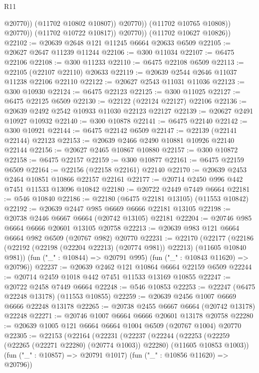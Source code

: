 \begin{lexlean}{R11}
\begin{coremodule}
{{{{{{{{{{{{{{{{{{{{{{{{{{{{{{{{{{{{{{{{{{{{{{{{{{{{{{{{{{{{{{{{{{{{{{{{{{{{{{{{{{                            @20770))
                        (@11702 @10802 @10807))
                      @20770))
                  (@11702 @10765 @10808))
                @20770))
            (@11702 @10722 @10817))
          @20770))
      (@11702 @10627 @10826))
@22102 := @20639 @2648 @121 @11245 @6664 @20633 @6509
@22105 := @20627 @2647 @11239 @11244
@22106 := @300 @11034
@22107 := @6475 @22106
@22108 := @300 @11233
@22110 := @6475 @22108 @6509
@22113 := @22105 (@22107 @22110) @20633
@22119 := @20639 @2544 @2646 @11037 @11238 @22106 @22110
@22122 := @20627 @2543 @11031 @11036
@22123 := @300 @10930
@22124 := @6475 @22123
@22125 := @300 @11025
@22127 := @6475 @22125 @6509
@22130 := @22122 (@22124 @22127) @22106
@22136 := @20639 @2492 @2542 @10933 @11030 @22123 @22127
@22139 := @20627 @2491 @10927 @10932
@22140 := @300 @10878
@22141 := @6475 @22140
@22142 := @300 @10921
@22144 := @6475 @22142 @6509
@22147 := @22139 (@22141 @22144) @22123
@22153 := @20639 @2466 @2490 @10881 @10926 @22140 @22144
@22156 := @20627 @2465 @10867 @10880
@22157 := @300 @10872
@22158 := @6475 @22157
@22159 := @300 @10877
@22161 := @6475 @22159 @6509
@22164 := @22156 (@22158 @22161) @22140
@22170 := @20639 @2453 @2464 @10851 @10866 @22157 @22161
@22177 := @20714 @2450 @996 @442 @7451 @11533 @13096 @10842
@22180 := @20722 @2449 @7449 @6664
@22181 := @546 @10840
@22186 := @22180 (@6475 @22181 @13105) (@11553 @10842)
@22192 := @20639 @2447 @985 @6669 @6666 @22181 @13105
@22198 := @20738 @2446 @6667 @6664 (@20742 @13105) @22181
@22204 := @20746 @985 @6664 @6666 @20601 @13105 @20758
@22213 := @20639 @983 @121 @6664 @6664 @982 @6509 (@20767 @982) @20770
@22231 := @22170
    (@22177
      (@22186 (@22192 (@22198 (@22204 @22213) (@20774 @981)) @22213) (@11605 @10840 @981))
      (fun ("_" : @10844) => @20791 @995)
      (fun ("_" : @10843 @11620) => @20796))
@22237 := @20639 @2462 @121 @10864 @6664 @22159 @6509
@22244 := @20714 @2459 @1018 @442 @7451 @11533 @13169 @10855
@22247 := @20722 @2458 @7449 @6664
@22248 := @546 @10853
@22253 := @22247 (@6475 @22248 @13178) (@11553 @10855)
@22259 := @20639 @2456 @1007 @6669 @6666 @22248 @13178
@22265 := @20738 @2455 @6667 @6664 (@20742 @13178) @22248
@22271 := @20746 @1007 @6664 @6666 @20601 @13178 @20758
@22280 := @20639 @1005 @121 @6664 @6664 @1004 @6509 (@20767 @1004) @20770
@22305 := @22153
    (@22164
      (@22231
        (@22237
          (@22244
            (@22253 (@22259 (@22265 (@22271 @22280) (@20774 @1003)) @22280) (@11605 @10853 @1003))
            (fun ("_" : @10857) => @20791 @1017)
            (fun ("_" : @10856 @11620) => @20796))
}}}}}}}}}}}}}}}}}}}}}}}}}}}}}}}}}}}}}}}}}}}}}}}}}}}}}}}}}}}}}}}}}}}}}}}}}}}}}}}}}}
\end{coremodule}
\end{lexlean}
